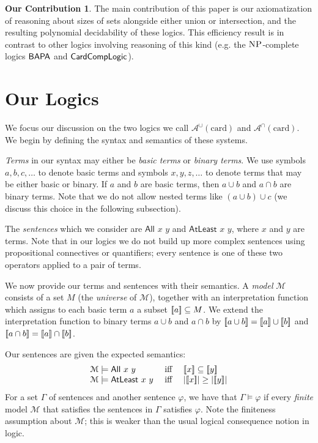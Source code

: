 \documentclass[letterpaper]{article} %
\theoremstyle{definition}
\newtheorem*{contribution*}{Our Contribution}
\newcommand{\semantics}[1]{[\![\mbox{\em $ #1 $\/}]\!]}
\newcommand{\Model}{\mathcal{M}}
\newcommand{\Aunion}{\mathscr{A}^{\cup}}
\newcommand{\Ainter}{\mathscr{A}^{\cap}}
\newcommand{\BAPA}{\sf{BAPA}}
\newcommand{\CardCompLogic}{\sf{CardCompLogic}}
\newcommand{\NP}{\textsc{NP}}
\newcommand{\All}[2]{\mathsf{All}\,\,#1\,\,#2}
\newcommand{\Atleast}[2]{\mathsf{AtLeast}\,\,#1\,\,#2}
\newcommand{\card}{\mathrm{card}}
\begin{document}
\begin{contribution*}
The main contribution of this paper is our axiomatization of reasoning about sizes of sets alongside either union or intersection, and the resulting polynomial decidability of these logics.  This efficiency result is in contrast to other logics involving reasoning of this kind (e.g. the $\NP$-complete logics $\BAPA$ and $\CardCompLogic$).
\end{contribution*}


\section{Our Logics}\label{s:logics}

We focus our discussion on the two logics we call $\Aunion(\card)$ and $\Ainter(\card)$. We begin by defining the syntax and semantics of these systems.

\emph{Terms} in our syntax may either be \emph{basic terms} or \emph{binary terms}.  We use symbols $a, b, c, \ldots$ to denote basic terms and symbols $x, y, z, \ldots$ to denote terms that may be either basic or binary. If $a$ and $b$ are basic terms, then $a \cup b$ and $a \cap b$ are binary terms. Note that we do not allow nested terms like $(a\cup b)\cup c$ (we discuss this choice in the following subsection). 

The \emph{sentences} which we consider are $\All{x}{y}$ and $\Atleast{x}{y}$, where $x$ and $y$ are terms.
Note that in our logics we do not build up more complex sentences using propositional connectives or quantifiers; every sentence is one of these two operators applied to a pair of terms.

We now provide our terms and sentences with their semantics.  A \emph{model} $\mathcal{M}$ consists of a set $M$ (the \emph{universe} of $\mathcal{M}$), together with an interpretation function which assigns to each basic term $a$ a subset $\semantics{a} \subseteq M$.  We extend the interpretation function to binary terms $a \cup b$ and $a \cap b$ by $\semantics{a \cup b} = \semantics{a} \cup \semantics{b}$ and $\semantics{a \cap b} = \semantics{a} \cap \semantics{b}$.

Our sentences are given the expected semantics:
\[
\begin{array}{lclcl}
    \Model \models \All{x}{y} & \textrm{ iff } & 
        \semantics{x} \subseteq \semantics{y}\\
    \Model \models \Atleast{x}{y} & \textrm{ iff } & 
        |\semantics{x}| \ge |\semantics{y}|
\end{array}
\] 
For a set $\Gamma$ of sentences and another sentence $\varphi$, we have that $\Gamma \vDash \varphi$ if every \textit{finite} model $\mathcal{M}$ that satisfies the sentences in $\Gamma$ satisfies $\varphi$.  Note the finiteness assumption about $\mathcal{M}$; this is weaker than the usual logical consequence notion in logic. 
\end{document}
